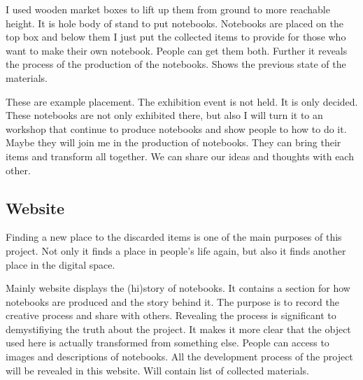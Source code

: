 I used wooden market boxes to lift up them from ground to more reachable height. It is hole body of stand to put notebooks. Notebooks are placed on the top box and below them I just put the collected items to provide for those who want to make their own notebook. People can get them both. Further it reveals the process of the production of the notebooks. Shows the previous state of the materials.


These are example placement. The exhibition event is not held. It is only decided. These notebooks are not only exhibited there, but also I will turn it to an workshop that continue to produce notebooks and show people to how to do it. Maybe they will join me in the production of notebooks. They can bring their items and transform all together. We can share our ideas and thoughts with each other. 





%
%
\subsection{Website}
Finding a new place to the discarded items is one of the main purposes of this project. Not only it finds a place in people's life again, but also it finds another place in the digital space.

Mainly website displays the (hi)story of notebooks. It contains a section for how notebooks are produced and the story behind it. The purpose is to record the creative process and share with others. Revealing the process is significant to demystifiying the truth about the project. It makes it more clear that the object used here is actually transformed from something else. People can access to images and descriptions of notebooks. All the development process of the project will be revealed in this website. Will contain list of collected materials. 

